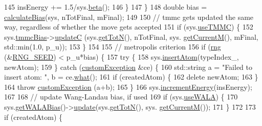 \begin{DoxyCode}
145                 insEnergy += 1.5/sys.\hyperlink{classsim_system_a3eeec9678902f8d7fce4dad6064aaf4c}{beta}();
146             \}
147         \}
148         \textcolor{keywordtype}{double} bias = \hyperlink{system_8cpp_acfe185adf03db047fd3753c0d788e0e3}{calculateBias}(sys, nTotFinal, mFinal);
149 
150         \textcolor{comment}{// tmmc gets updated the same way, regardless of whether the move gets accepted}
151         \textcolor{keywordflow}{if} (sys.\hyperlink{classsim_system_aa474a50b6353c8897331b1ab1ce53ab1}{useTMMC}) \{
152             sys.\hyperlink{classsim_system_a13173f45a1e40a5f5a3552b0ebe15b54}{tmmcBias}->\hyperlink{classtmmc_ae067afc5b52af203b9d45f18d9737219}{updateC} (sys.\hyperlink{classsim_system_a37dd827f4057049763351510147b9f1d}{getTotN}(), nTotFinal, sys.
      \hyperlink{classsim_system_a299fe4372e610b554eaaf5f5957b2dbc}{getCurrentM}(), mFinal, std::min(1.0, p\_u));
153         \}
154 
155     \textcolor{comment}{// metropolis criterion}
156     \textcolor{keywordflow}{if} (\hyperlink{utilities_8cpp_a0f9542af4b475ac79cb679d7a8d14db0}{rng} (&\hyperlink{global_8h_a3f4e4ea24d5a5c66feae55d1f329c884}{RNG\_SEED}) < p\_u*bias) \{
157             \textcolor{keywordflow}{try} \{
158                     sys.\hyperlink{classsim_system_a0404e9435cc046d19b6bb990678ee069}{insertAtom}(typeIndex\_, newAtom);
159             \} \textcolor{keywordflow}{catch} (\hyperlink{classcustom_exception}{customException} &ce) \{
160                     std::string a = \textcolor{stringliteral}{"Failed to insert atom: "}, b = ce.\hyperlink{classcustom_exception_aeb6ab5848b038adfc68fde86a512f691}{what}();
161             \textcolor{keywordflow}{if} (createdAtom) \{
162                 \textcolor{keyword}{delete} newAtom;
163             \}
164                     \textcolor{keywordflow}{throw} \hyperlink{classcustom_exception}{customException} (a+b);
165             \}
166         sys.\hyperlink{classsim_system_a6ad31c08955b80873f865b3069618dcb}{incrementEnergy}(insEnergy);
167 
168         \textcolor{comment}{// update Wang-Landau bias, if used}
169         \textcolor{keywordflow}{if} (sys.\hyperlink{classsim_system_aa83b00006b3919fb6e13f1bdeadece6a}{useWALA}) \{
170             sys.\hyperlink{classsim_system_a7cb5049de8b0988349e89e30e4000407}{getWALABias}()->\hyperlink{classwala_ab439e3f60bea6c54522a870b9ad67acf}{update}(sys.\hyperlink{classsim_system_a37dd827f4057049763351510147b9f1d}{getTotN}(), sys.
      \hyperlink{classsim_system_a299fe4372e610b554eaaf5f5957b2dbc}{getCurrentM}());
171         \}
172 
173         \textcolor{keywordflow}{if} (createdAtom) \{

\end{DoxyCode}
